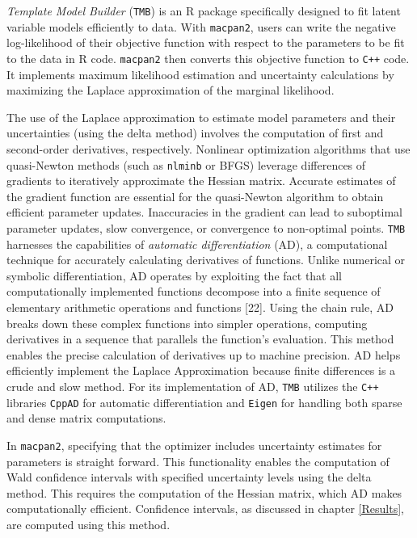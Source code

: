 \documentclass[
11pt, %
oneside, %
english, %
singlespacing, %
]{macthesis} %
\begin{document}
\emph{Template Model Builder} (\texttt{TMB}) is an R package specifically designed to fit latent variable models efficiently to data. With \texttt{macpan2}, users can write the negative log-likelihood of their objective function with respect to the parameters to be fit to the data in R code. \texttt{macpan2} then converts this objective function to \texttt{C++} code. It implements maximum likelihood estimation and uncertainty calculations by maximizing the Laplace approximation of the marginal likelihood.

The use of the Laplace approximation to estimate model parameters and their uncertainties (using the delta method) involves the computation of first and second-order derivatives, respectively. Nonlinear optimization algorithms that use quasi-Newton methods (such as \texttt{nlminb} or BFGS) leverage differences of gradients to iteratively approximate the Hessian matrix. Accurate estimates of the gradient function are essential for the quasi-Newton algorithm to obtain efficient parameter updates. Inaccuracies in the gradient can lead to suboptimal parameter updates, slow convergence, or convergence to non-optimal points. \texttt{TMB} harnesses the capabilities of \emph{automatic differentiation} (AD), a computational technique for accurately calculating derivatives of functions. Unlike numerical or symbolic differentiation, AD operates by exploiting the fact that all computationally implemented functions decompose into a finite sequence of elementary arithmetic operations and functions {[}22{]}. Using the chain rule, AD breaks down these complex functions into simpler operations, computing derivatives in a sequence that parallels the function's evaluation. This method enables the precise calculation of derivatives up to machine precision. AD helps efficiently implement the Laplace Approximation because finite differences is a crude and slow method. For its implementation of AD, \texttt{TMB} utilizes the \texttt{C++} libraries \texttt{CppAD} for automatic differentiation and \texttt{Eigen} for handling both sparse and dense matrix computations.

In \texttt{macpan2}, specifying that the optimizer includes uncertainty estimates for parameters is straight forward. This functionality enables the computation of Wald confidence intervals with specified uncertainty levels using the delta method. This requires the computation of the Hessian matrix, which AD makes computationally efficient. Confidence intervals, as discussed in chapter \ref{Results}, are computed using this method.
\end{document}
